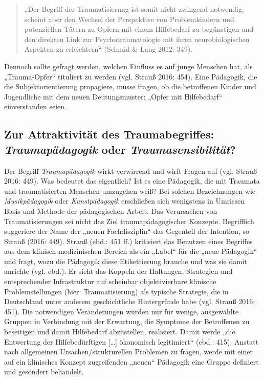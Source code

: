 \begin{quote}
\small{„Der Begriff der Traumatisierung ist somit nicht zwingend notwendig, scheint aber den Wechsel der Perspektive von Problemkindern und potenziellen T{\"a}tern zu Opfern mit einem Hilfebedarf zu beg{\"u}nstigen und den direkten Link zur Psychotraumatologie mit ihren neurobiologischen Aspekten zu erleichtern“ (Schmid \& Lang 2012: 349).}
\end{quote}

Dennoch sollte gefragt werden, welchen Einfluss es auf junge Menschen hat, als „Trauma-Opfer“ tituliert zu werden (vgl. Strauß 2016: 454). Eine Pädagogik, die die Subjektorientierung propagiere, müsse fragen, ob die betroffenen Kinder und Jugendliche mit dem neuen Deutungsmuster: „Opfer mit Hilfebedarf“ einverstanden seien.

\subsection{Zur Attraktivität des Traumabegriffes: \textit{Traumap{\"a}dagogik} oder \textit{Traumasensibilität}?}
Der Begriff \textit{Traumapädagogik} wirkt verwirrend und wirft Fragen auf (vgl. Strauß 2016: 449). Was bedeutet das eigentlich? Ist es eine Pädagogik, die mit Traumata und traumatisierten Menschen umzugehen weiß? Bei solchen Bezeichnungen wie \textit{Musikpädagogik} oder \textit{Kunstpädagogik} erschließen sich wenigstens in Umrissen Basis und Methode der pädagogischen Arbeit. Das Verursachen von Traumatisierungen sei nicht das Ziel traumapädagogischer Konzepte. Begrifflich suggeriere der Name der „neuen Fachdisziplin“ das Gegenteil der Intention, so Strauß (2016: 449). Strauß (ebd.: 451 ff.) kritisiert das Benutzen eines Begriffes aus dem klinisch-medizinischen Bereich als ein „Label“ für die „neue Pädagogik“ und fragt, wozu die Pädagogik diese Etikettierung brauche und was sie damit anrichte (vgl. ebd.). Er sieht das Koppeln der Haltungen, Strategien und entsprechender Infrastruktur auf scheinbar objektivierbare klinische Problemstellungen (hier: Traumatisierung) als typische Strategie, die in Deutschland unter anderem geschichtliche Hintergründe habe (vgl. Strauß 2016: 451). Die notwendigen Veränderungen würden nur für wenige, ausgewählte Gruppen in Verbindung mit der Erwartung, die Symptome der Betroffenen zu beseitigen und damit Hilfebedarf abzustellen, realisiert. Damit werde „die Entwertung der Hilfebedürftigen […] ökonomisch legitimiert“ (ebd.: 415). Anstatt nach allgemeinen Ursachen/strukturellen Problemen zu fragen, werde mit einer auf ein klinisches Konzept zugreifenden „neuen“ Pädagogik eine Gruppe definiert und gesondert behandelt.

